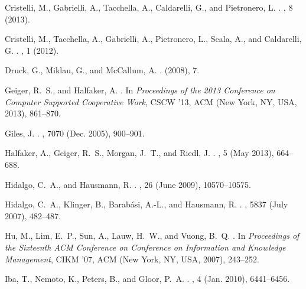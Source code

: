 \begin{thebibliography}{10}
Cristelli, M., Gabrielli, A., Tacchella, A., Caldarelli, G., and Pietronero, L.
.
, 8 (2013).

Cristelli, M., Tacchella, A., Gabrielli, A., Pietronero, L., Scala, A., and
  Caldarelli, G.
.
, 1 (2012).

Druck, G., Miklau, G., and McCallum, A.
.
  (2008), 7.

Geiger, R.~S., and Halfaker, A.
.
\newblock In {\em Proceedings of the 2013 Conference on Computer Supported
  Cooperative Work}, CSCW '13, ACM (New York, NY, USA, 2013), 861--870.

Giles, J.
.
, 7070 (Dec. 2005), 900--901.

Halfaker, A., Geiger, R.~S., Morgan, J.~T., and Riedl, J.
.
, 5 (May 2013), 664--688.

Hidalgo, C.~A., and Hausmann, R.
.
, 26 (June
  2009), 10570--10575.

Hidalgo, C.~A., Klinger, B., Barab\'{a}si, A.-L., and Hausmann, R.
.
, 5837 (July 2007), 482--487.

Hu, M., Lim, E.~P., Sun, A., Lauw, H.~W., and Vuong, B.~Q.
.
\newblock In {\em Proceedings of the Sixteenth ACM Conference on Conference on
  Information and Knowledge Management}, CIKM '07, ACM (New York, NY, USA,
  2007), 243--252.

Iba, T., Nemoto, K., Peters, B., and Gloor, P.~A.
.
, 4 (Jan. 2010),
  6441--6456.


\end{thebibliography}

